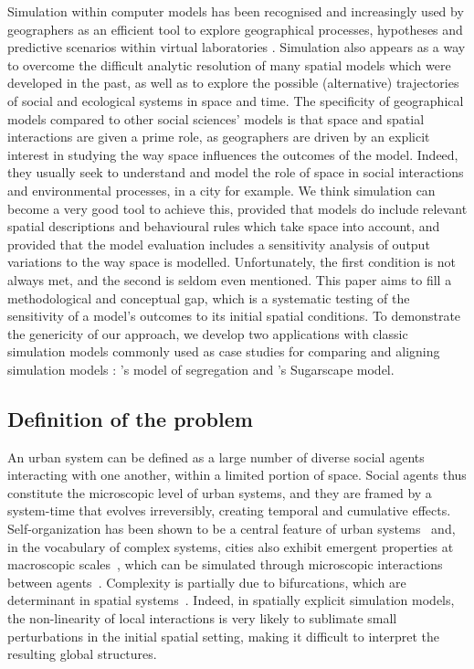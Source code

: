 \documentclass[3p,times,procedia]{elsarticle}
\begin{document}
Simulation within computer models has been recognised and increasingly used by geographers as an efficient tool to explore geographical processes, hypotheses and predictive scenarios within virtual laboratories \citep{batty1971modelling, batty2007model, carley1999generating, Quesneletal2009}. %
 Simulation also appears as a way to overcome the difficult analytic resolution of many spatial models which were developed in the past, as well as to explore the possible (alternative) trajectories of social and ecological systems in space and time. The specificity of geographical models compared to other social sciences' models is that space and spatial interactions are given a prime role, as geographers are driven by an explicit interest in studying the way space influences the outcomes of the model. Indeed, they usually seek to understand and model the role of space in social interactions and environmental processes, in a city for example. We think simulation can become a very good tool to achieve this, provided that models do include relevant spatial descriptions and behavioural rules which take space into account, and provided that the model evaluation includes a sensitivity analysis of output variations to the way space is modelled. Unfortunately, the first condition is not always met, and the second is seldom even mentioned. This paper aims to fill a methodological and conceptual gap, which is a systematic testing of the sensitivity of a model's outcomes to its initial spatial conditions. To demonstrate the genericity of our approach, we develop two applications with classic simulation models commonly used as case studies for comparing and aligning simulation models \citep{Axtelletal1996, wilensky2007making}: \citet{schelling1971dynamic}'s model of segregation and \citet{EpsteinAxtell1996}'s Sugarscape model.\\

\subsection{Definition of the problem}

An urban system can be defined as a large number of diverse social agents interacting with one another, within a limited portion of space. Social agents thus constitute the microscopic level of urban systems, and they are framed by a system-time that evolves irreversibly, creating temporal and cumulative effects. Self-organization has been shown to be a central feature of urban systems~\citep{AllenSanglier1981,saint1989villes, Portugali2000} and, in the vocabulary of complex systems, cities also exhibit emergent properties at macroscopic scales~\citep{pumain2006hierarchy, AzizAlaouiBertelle2009}, which can be simulated through microscopic interactions between agents~\citep{Wu2002, Batty2007}. Complexity is partially due to bifurcations, which are determinant in spatial systems~\citep{Wilson1981, Wilson2002}. Indeed, in spatially explicit simulation models, the non-linearity of local interactions is very likely to sublimate small perturbations in the initial spatial setting, making it difficult to interpret the resulting global structures. \\
\end{document}
